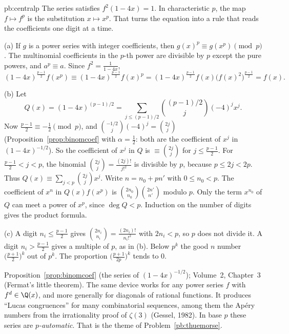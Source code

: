 \begin{solution}{pb:centralp}
\idea The series satisfies $f^2(1-4x)=1$. In characteristic $p$, the map $f\mapsto f^p$ is the substitution $x\mapsto x^p$. That turns the equation into a rule that reads the coefficients one digit at a time.

\writeup (a) If $g$ is a power series with integer coefficients, then $g(x)^p\equiv g(x^p)\pmod p$. The multinomial coefficients in the
$p$-th power are divisible by $p$ except the pure powers, and $a^p\equiv a$. Since $f^2=\frac1{1-4x}$,
\[
(1-4x)^{\frac{p-1}2}f(x^p)\equiv(1-4x)^{\frac{p-1}2}f(x)^p=(1-4x)^{\frac{p-1}2}f(x)\bigl(f(x)^2\bigr)^{\frac{p-1}2}=f(x).
\]

(b) Let
\[
Q(x)=(1-4x)^{(p-1)/2}=\sum_{j\le(p-1)/2}\binom{(p-1)/2}j(-4)^jx^j.
\]
Now $\frac{p-1}2\equiv-\frac12\pmod p$, and
$\binom{-1/2}j(-4)^j=\binom{2j}j$ (Proposition~\ref{prop:binomcoef} with $\alpha=\frac12$: both are the coefficient of $x^j$ in $(1-4x)^{-1/2}$). So the coefficient of $x^j$ in $Q$ is $\equiv\binom{2j}j$ for $j\le\frac{p-1}2$. For
$\frac{p-1}2<j<p$, the binomial $\binom{2j}j=\frac{(2j)!}{j!^2}$ is divisible by $p$, because $p\le2j<2p$. Thus $Q(x)\equiv\sum_{j<p}\binom{2j}jx^j$. Write
$n=n_0+pn'$ with $0\le n_0<p$. The coefficient of $x^n$ in $Q(x)f(x^p)$ is $\binom{2n_0}{n_0}\binom{2n'}{n'}$ modulo $p$. Only the term
$x^{n_0}$ of $Q$ can meet a power of $x^p$, since $\deg Q<p$. Induction on the number of digits gives the product
formula.

(c) A digit $n_i\le\frac{p-1}2$ gives $\binom{2n_i}{n_i}=\frac{(2n_i)!}{n_i!^2}$ with $2n_i<p$, so $p$ does not divide it. A digit $n_i>\frac{p-1}2$ gives a
multiple of $p$, as in (b). Below $p^k$ the good $n$ number $\bigl(\frac{p+1}2\bigr)^k$ out of $p^k$. The proportion
$\bigl(\frac{p+1}{2p}\bigr)^k$ tends to $0$.

\tools Proposition~\ref{prop:binomcoef} (the series of $(1-4x)^{-1/2}$); Volume~2, Chapter~3 (Fermat's little theorem).
\leads The same device works for any power series $f$ with $f^d\in\Q(x)$, and more generally for diagonals of rational functions.
It produces ``Lucas congruences'' for many combinatorial sequences, among them the Apéry numbers from the irrationality proof of $\zeta(3)$
(Gessel, 1982). In base $p$
these series are \emph{$p$-automatic}. That is the theme of Problem~\ref{pb:thuemorse}.
\end{solution}


